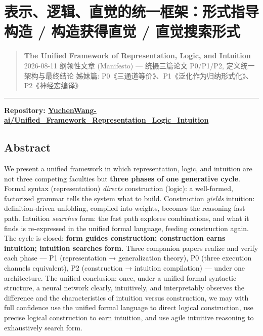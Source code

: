 \documentclass[
]{article}
\author{}
\date{}
\begin{document}
\section{表示、逻辑、直觉的统一框架：形式指导构造 / 构造获得直觉 /
直觉搜索形式}\label{ux8868ux793aux903bux8f91ux76f4ux89c9ux7684ux7edfux4e00ux6846ux67b6ux5f62ux5f0fux6307ux5bfcux6784ux9020-ux6784ux9020ux83b7ux5f97ux76f4ux89c9-ux76f4ux89c9ux641cux7d22ux5f62ux5f0f}

\begin{quote}
\textbf{The Unified Framework of Representation, Logic, and Intuition}
\textbar{} 2026-08-11 纲领性文章 (Manifesto) --- 统摄三篇论文 P0/P1/P2,
定义统一架构与最终结论 姊妹篇:
P0《三通道等价》、P1《泛化作为归纳形式化》、P2《神经宏编译》
\end{quote}

\begin{center}\rule{0.5\linewidth}{0.5pt}\end{center}

\textbf{Repository:
\href{https://github.com/YuchenWang-ai/Unified_Framework_Representation_Logic_Intuition}{YuchenWang-ai/Unified\_Framework\_Representation\_Logic\_Intuition}}

\subsection{Abstract}\label{abstract}

We present a unified framework in which representation, logic, and
intuition are not three competing faculties but \textbf{three phases of
one generative cycle}. Formal syntax (representation) \emph{directs}
construction (logic): a well-formed, factorized grammar tells the system
what to build. Construction \emph{yields} intuition: definition-driven
unfolding, compiled into weights, becomes the reasoning fast path.
Intuition \emph{searches} form: the fast path explores combinations, and
what it finds is re-expressed in the unified formal language, feeding
construction again. The cycle is closed: \textbf{form guides
construction; construction earns intuition; intuition searches form.}
Three companion papers realize and verify each phase --- P1
(representation → generalization theory), P0 (three execution channels
equivalent), P2 (construction → intuition compilation) --- under one
architecture. The unified conclusion: once, under a unified formal
syntactic structure, a neural network clearly, intuitively, and
interpretably observes the difference and the characteristics of
intuition versus construction, we may with full confidence use the
unified formal language to direct logical construction, use precise
logical construction to earn intuition, and use agile intuitive
reasoning to exhaustively search form.
\end{document}
